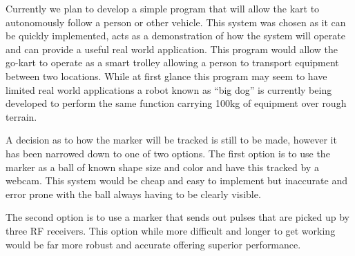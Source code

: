Currently we plan to develop a simple program that will allow the kart to autonomously follow a person or other vehicle. This system was chosen as it can be quickly implemented, acts as a demonstration of how the system will operate and can provide a useful real world application. This program would allow the go-kart to operate as a smart trolley allowing a person to transport equipment between two locations. While at first glance this program may seem to have limited real world applications a robot known as ``big dog'' is currently being developed to perform the same function carrying 100kg of equipment over rough terrain\cite{bigdog}.

A decision as to how the marker will be tracked is still to be made, however it has been narrowed down to one of two options. The first option is to use the marker as a ball of known shape size and color and have this tracked by a webcam. This system would be cheap and easy to implement but inaccurate and error prone with the ball always having to be clearly visible.

The second option is to use a marker that sends out pulses that are picked up by three RF receivers. This option while more difficult and longer to get working would be far more robust and accurate offering superior performance.



